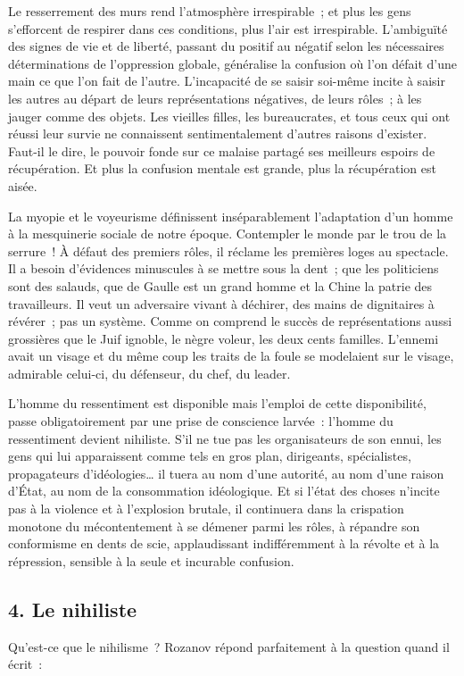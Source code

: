 \documentclass[french,twoside]{book} %
\begin{document}
Le resserrement des murs rend l’atmosphère irrespirable ; et plus les gens s’efforcent de respirer dans ces conditions, plus l’air est irrespirable. L’ambiguïté des signes de vie et de liberté, passant du positif au négatif selon les nécessaires déterminations de l’oppression globale, généralise la confusion où l’on défait d’une main ce que l’on fait de l’autre. L’incapacité de se saisir soi-même incite à saisir les autres au départ de leurs représentations négatives, de leurs rôles ; à les jauger comme des objets. Les vieilles filles, les bureaucrates, et tous ceux qui ont réussi leur survie ne connaissent sentimentalement d’autres raisons d’exister. Faut-il le dire, le pouvoir fonde sur ce malaise partagé ses meilleurs espoirs de récupération. Et plus la confusion mentale est grande, plus la récupération est aisée.\par
La myopie et le voyeurisme définissent inséparablement l’adaptation d’un homme à la mesquinerie sociale de notre époque. Contempler le monde par le trou de la serrure ! À défaut des premiers rôles, il réclame les premières loges au spectacle. Il a besoin d’évidences minuscules à se mettre sous la dent ; que les politiciens sont des salauds, que de Gaulle est un grand homme et la Chine la patrie des travailleurs. Il veut un adversaire vivant à déchirer, des mains de dignitaires à révérer ; pas un système. Comme on comprend le succès de représentations aussi grossières que le Juif ignoble, le nègre voleur, les deux cents familles. L’ennemi avait un visage et du même coup les traits de la foule se modelaient sur le visage, admirable celui-ci, du défenseur, du chef, du leader.\par
L’homme du ressentiment est disponible mais l’emploi de cette disponibilité, passe obligatoirement par une prise de conscience larvée : l’homme du ressentiment devient nihiliste. S’il ne tue pas les organisateurs de son ennui, les gens qui lui apparaissent comme tels en gros plan, dirigeants, spécialistes, propagateurs d’idéologies… il tuera au nom d’une autorité, au nom d’une raison d’État, au nom de la consommation idéologique. Et si l’état des choses n’incite pas à la violence et à l’explosion brutale, il continuera dans la crispation monotone du mécontentement à se démener parmi les rôles, à répandre son conformisme en dents de scie, applaudissant indifféremment à la révolte et à la répression, sensible à la seule et incurable confusion.
\subsection[{4. Le nihiliste}]{\textsc{4.} Le nihiliste}
\noindent Qu’est-ce que le nihilisme ? Rozanov répond parfaitement à la question quand il écrit :\par
\end{document}
